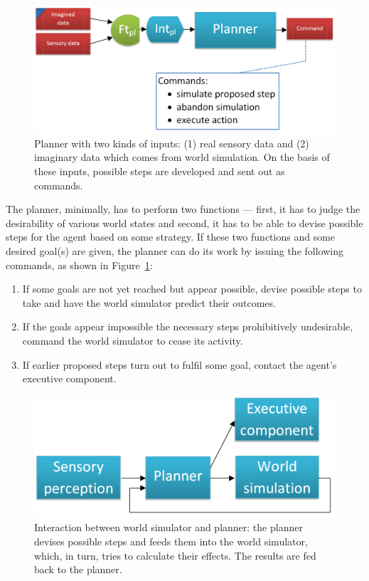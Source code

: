 \begin{figure}
	\centering
	\includegraphics[width=\textwidth]{Figs/planner.png}
	\caption{Planner with two kinds of inputs: (1) real sensory data and (2) imaginary data which comes from world simulation. On the basis of these inputs, possible steps are developed and sent out as commands.}
	\label{fig:planner}
\end{figure}

The planner, minimally, has to perform two functions --- first, it has to judge the desirability of various world states and second, it has to be able to devise possible steps for the agent based on some strategy. If these two functions and some desired goal(s) are given, the planner can do its work by issuing the following commands, as shown in Figure~\ref{fig:planner}:
\begin{enumerate}
	\item If some goals are not yet reached but appear possible, devise possible steps to take and have the world simulator predict their outcomes.
	\item If the goals appear impossible the necessary steps prohibitively undesirable, command the world simulator to cease its activity.
	\item If earlier proposed steps turn out to fulfil some goal, contact the agent's executive component.
\end{enumerate}

\begin{figure}
	\centering
	\includegraphics[width=\textwidth]{Figs/worldSimulatorPlannerInteraction.png}
	\caption{Interaction between world simulator and planner: the planner devises possible steps and feeds them into the world simulator, which, in turn, tries to calculate their effects. The results are fed back to the planner.}
	\label{fig:worldSimulatorPlannerInteraction}
\end{figure}

